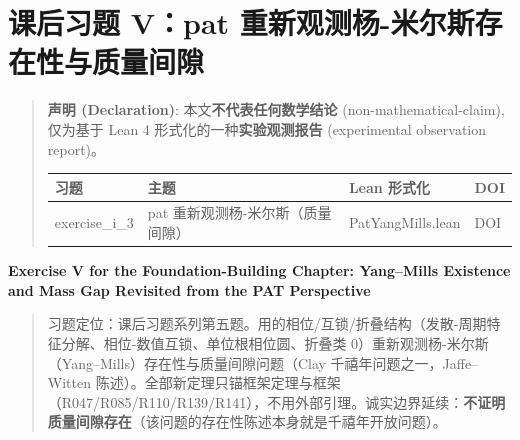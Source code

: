 \documentclass[
]{article}
\author{}
\date{}
\newcounter{none} %
\begin{document}
\section{课后习题 V：pat
重新观测杨-米尔斯存在性与质量间隙}\label{ux7b51ux57faux7bc7ux8bfeux540eux4e60ux9898-vpat-ux91cdux65b0ux89c2ux6d4bux6768-ux7c73ux5c14ux65afux5b58ux5728ux6027ux4e0eux8d28ux91cfux95f4ux9699}

\begin{quote}
\textbf{声明 (Declaration)}: 本文\textbf{不代表任何数学结论}
(non-mathematical-claim), 仅为基于 Lean 4
形式化的一种\textbf{实验观测报告} (experimental observation report)。

{\def\LTcaptype{none} %
\begin{longtable}[]{@{}
 >{\raggedright\arraybackslash}p{}
 >{\raggedright\arraybackslash}p{}
 >{\raggedright\arraybackslash}p{}
 >{\raggedright\arraybackslash}p{}@{}}
\toprule\noalign{}
\begin{minipage}[b]{\linewidth}\raggedright
习题
\end{minipage} & \begin{minipage}[b]{\linewidth}\raggedright
主题
\end{minipage} & \begin{minipage}[b]{\linewidth}\raggedright
Lean 形式化
\end{minipage} & \begin{minipage}[b]{\linewidth}\raggedright
DOI
\end{minipage} \\
\midrule\noalign{}
\endhead
\bottomrule\noalign{}
\endlastfoot
exercise\_i\_3 & pat 重新观测杨-米尔斯（质量间隙） & PatYangMills.lean &
DOI \\
\end{longtable}
}
\end{quote}

\textbf{Exercise V for the Foundation-Building Chapter: Yang--Mills
Existence and Mass Gap Revisited from the PAT Perspective}

\begin{quote}
习题定位：课后习题系列第五题。用的相位/互锁/折叠结构（发散-周期特征分解、相位-数值互锁、单位根相位圆、折叠类
0）重新观测杨-米尔斯（Yang--Mills）存在性与质量间隙问题（Clay
千禧年问题之一，Jaffe--Witten
陈述）。全部新定理只锚框架定理与框架（R047/R085/R110/R139/R141），不用外部引理。诚实边界延续：\textbf{不证明质量间隙存在}（该问题的存在性陈述本身就是千禧年开放问题）。
\end{quote}
\end{document}
